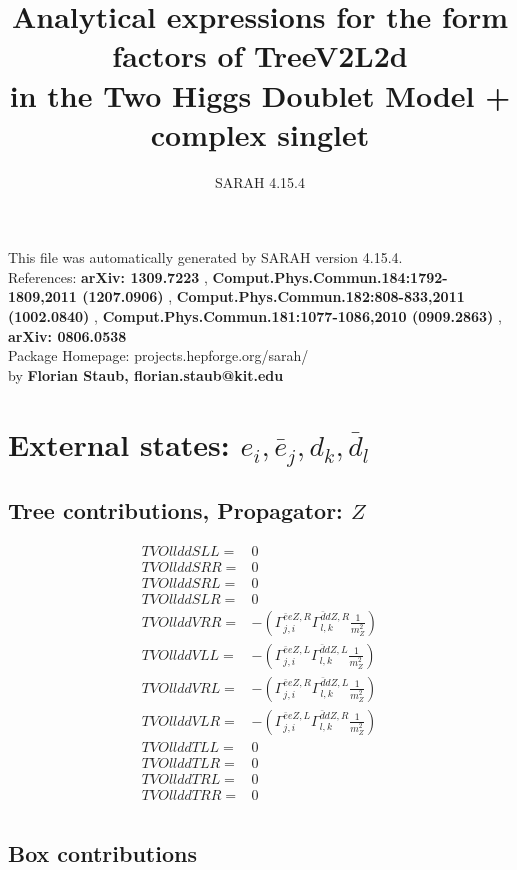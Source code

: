 \documentclass[A4,landscape]{article}
\begin{document}
\title{Analytical expressions for the form factors of TreeV2L2d\\ in the Two Higgs Doublet Model + complex singlet } 
 \author{SARAH 4.15.4} 
 \maketitle 
 \vspace{10cm} 
This file was automatically generated by SARAH version 4.15.4.  \\ 
References: {\bf arXiv: 1309.7223 }, {\bf Comput.Phys.Commun.184:1792-1809,2011 (1207.0906) }, {\bf Comput.Phys.Commun.182:808-833,2011 (1002.0840) }, {\bf Comput.Phys.Commun.181:1077-1086,2010 (0909.2863) }, {\bf arXiv: 0806.0538 } \\ 
Package Homepage: projects.hepforge.org/sarah/ \\ 
by {\bf Florian Staub, florian.staub@kit.edu} 
 \pagebreak 
 \tableofcontents 
 \pagebreak 
\section{External states: ${e_{{i}}, \bar{e}_{{j}}, d_{{k}}, \bar{d}_{{l}}}$} 
\subsection{Tree contributions, Propagator: $Z$} 

\begin{align} 
  TVOllddSLL= & 0 \\ 
  TVOllddSRR= & 0 \\ 
  TVOllddSRL= & 0 \\ 
  TVOllddSLR= & 0 \\ 
  TVOllddVRR= & -(\Gamma^{\bar{e}e Z ,R}_{j, i} \Gamma^{\bar{d}d Z ,R}_{l, k} \frac{1}{m^2_{Z}}) \\ 
  TVOllddVLL= & -(\Gamma^{\bar{e}e Z ,L}_{j, i} \Gamma^{\bar{d}d Z ,L}_{l, k} \frac{1}{m^2_{Z}}) \\ 
  TVOllddVRL= & -(\Gamma^{\bar{e}e Z ,R}_{j, i} \Gamma^{\bar{d}d Z ,L}_{l, k} \frac{1}{m^2_{Z}}) \\ 
  TVOllddVLR= & -(\Gamma^{\bar{e}e Z ,L}_{j, i} \Gamma^{\bar{d}d Z ,R}_{l, k} \frac{1}{m^2_{Z}}) \\ 
  TVOllddTLL= & 0 \\ 
  TVOllddTLR= & 0 \\ 
  TVOllddTRL= & 0 \\ 
  TVOllddTRR= & 0 \\ 
\end{align} 
\subsection{Box contributions} 
\end{document}
